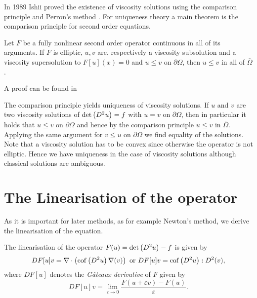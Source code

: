 In 1989 Ishii proved the existence of viscosity solutions using the comparison principle and Perron's method \cite{Ishii1989}. For uniqueness theory a main theorem is the comparison principle for second order equations.

\begin{theorem}
	Let $F$ be a fully nonlinear second order operator continuous in all of its arguments.
	If $F$ is elliptic,	$u,v$ are, respectively a viscosity subsolution and a viscosity supersolution to $F[u](x)=0$ and $u \leq v$ on $\partial \Omega$, then $u \leq v$ in all of $\overline \Omega$.
\end{theorem}
A proof can be found in \cite[Theorem 17.1]{GT1983}

The comparison principle yields uniqueness of viscosity solutions. If $u$ and $v$ are two viscosity solutions of $\det{\left(D^2 u\right)}=f$ with $u=v$ on $\partial \Omega$, then in particular it holds that $u \leq v$ on $\partial \Omega$ and hence by the comparison principle $u \leq v$ in  $\overline \Omega$. Applying the same argument for $v \leq u$ on $\partial \Omega$ we find equality of the solutions. Note that a viscosity solution has to be convex since otherwise the \MA operator is not elliptic. Hence we have uniqueness in the case of viscosity solutions although classical solutions are ambiguous.

\section{The Linearisation of the \MA operator}\label{sec: linearisation}

As it is important for later methods, as for example Newton's method, we derive the linearisation of the \MA equation. 
	\begin{theorem}[Linearisation] \label{thm: linearisation}
		The linearisation of the \MA operator $F(u)=\det{\left(D^2u\right)}-f$ is given by
		\begin{align}
			DF[u]v = \nabla \cdot \left( \operatorname{cof} \left( D^2 u  \right) \nabla (v) \right) \text{ or } DF[u]v=\operatorname{cof} \left( D^2 u \right):D^2 (v),		\end{align}
	where $DF[u]$ denotes the \emph{G\^ateaux derivative} of $F$ given by
	\[
		DF[u]v = \lim\limits_{\varepsilon \rightarrow 0} \frac { F(u+\varepsilon v) - F(u)}\varepsilon.
	\]
	\end{theorem}
		
